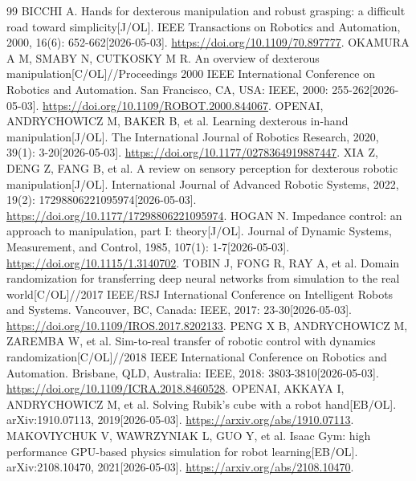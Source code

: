 
%
%


\begin{thebibliography}{99}
\setlength{\itemsep}{0pt}
 BICCHI A. Hands for dexterous manipulation and robust grasping: a difficult road toward simplicity[J/OL]. IEEE Transactions on Robotics and Automation, 2000, 16(6): 652-662[2026-05-03]. \url{https://doi.org/10.1109/70.897777}.
 OKAMURA A M, SMABY N, CUTKOSKY M R. An overview of dexterous manipulation[C/OL]//Proceedings 2000 IEEE International Conference on Robotics and Automation. San Francisco, CA, USA: IEEE, 2000: 255-262[2026-05-03]. \url{https://doi.org/10.1109/ROBOT.2000.844067}.
 OPENAI, ANDRYCHOWICZ M, BAKER B, et al. Learning dexterous in-hand manipulation[J/OL]. The International Journal of Robotics Research, 2020, 39(1): 3-20[2026-05-03]. \url{https://doi.org/10.1177/0278364919887447}.
 XIA Z, DENG Z, FANG B, et al. A review on sensory perception for dexterous robotic manipulation[J/OL]. International Journal of Advanced Robotic Systems, 2022, 19(2): 17298806221095974[2026-05-03]. \url{https://doi.org/10.1177/17298806221095974}.
 HOGAN N. Impedance control: an approach to manipulation, part I: theory[J/OL]. Journal of Dynamic Systems, Measurement, and Control, 1985, 107(1): 1-7[2026-05-03]. \url{https://doi.org/10.1115/1.3140702}.
 TOBIN J, FONG R, RAY A, et al. Domain randomization for transferring deep neural networks from simulation to the real world[C/OL]//2017 IEEE/RSJ International Conference on Intelligent Robots and Systems. Vancouver, BC, Canada: IEEE, 2017: 23-30[2026-05-03]. \url{https://doi.org/10.1109/IROS.2017.8202133}.
 PENG X B, ANDRYCHOWICZ M, ZAREMBA W, et al. Sim-to-real transfer of robotic control with dynamics randomization[C/OL]//2018 IEEE International Conference on Robotics and Automation. Brisbane, QLD, Australia: IEEE, 2018: 3803-3810[2026-05-03]. \url{https://doi.org/10.1109/ICRA.2018.8460528}.
 OPENAI, AKKAYA I, ANDRYCHOWICZ M, et al. Solving Rubik's cube with a robot hand[EB/OL]. arXiv:1910.07113, 2019[2026-05-03]. \url{https://arxiv.org/abs/1910.07113}.
 MAKOVIYCHUK V, WAWRZYNIAK L, GUO Y, et al. Isaac Gym: high performance GPU-based physics simulation for robot learning[EB/OL]. arXiv:2108.10470, 2021[2026-05-03]. \url{https://arxiv.org/abs/2108.10470}.

\end{thebibliography}
